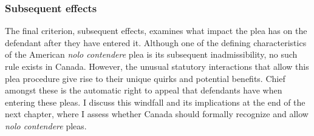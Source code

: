 \subsubsection{Subsequent effects}

The final criterion, subsequent effects, examines what impact the plea has on the defendant after they have entered it. Although one of the defining characteristics of the American \textit{nolo contendere} plea is its subsequent inadmissibility, no such rule exists in Canada. However, the unusual statutory interactions that allow this plea procedure give rise to their unique quirks and potential benefits. Chief amongst these is the automatic right to appeal that defendants have when entering these pleas. I discuss this windfall and its implications at the end of the next chapter, where I assess whether Canada should formally recognize and allow \textit{nolo contendere} pleas.